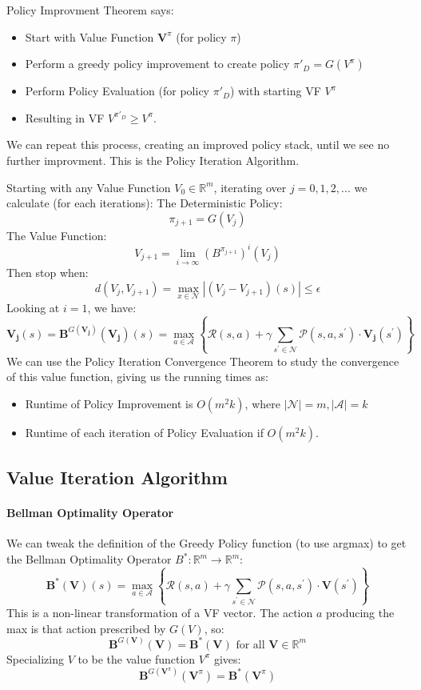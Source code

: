 \documentclass[11pt]{article}
\begin{document}
Policy Improvment Theorem says:
\begin{itemize}
    \item Start with Value Function $\boldsymbol{V}^\pi$ (for policy $\pi$)
    \item Perform a greedy policy improvement to create policy $\pi'_D=G(V^\pi)$
    \item Perform Policy Evaluation (for policy $\pi'_D$) with starting VF $V^\pi$
    \item Resulting in VF $V^{\pi'_D} \geq V^\pi$.
\end{itemize}
We can repeat this process, creating an improved policy stack, until we see no further improvment. This is the Policy Iteration Algorithm.

Starting with any Value Function $V_0\in\mathbb{R}^m$, iterating over $j = 0, 1, 2, ...$ we calculate (for each iterations):
The Deterministic Policy:
$$ \pi_{j+1} = G(V_j)$$
The Value Function:
$$ V_{j+1} = \lim_{i\rightarrow\infty}(B^{\pi_{j+1}})^i(V_j)$$
Then stop when:
$$ d(V_j, V_{j+1}) = \max_{x\in\mathcal{N}}|(V_j - V_{j+1})(s)| \leq \epsilon$$
Looking at $i = 1$, we have: 
$$
\boldsymbol{V}_{\boldsymbol{j}}(s)=\boldsymbol{B}^{G\left(\boldsymbol{V}_{\boldsymbol{j}}\right)}\left(\boldsymbol{V}_{\boldsymbol{j}}\right)(s)=\max _{a \in \mathcal{A}}\left\{\mathcal{R}(s, a)+\gamma \sum_{s^{\prime} \in \mathcal{N}} \mathcal{P}\left(s, a, s^{\prime}\right) \cdot \boldsymbol{V}_{\boldsymbol{j}}\left(s^{\prime}\right)\right\}
$$
We can use the Policy Iteration Convergence Theorem to study the convergence of this value function, giving us the running times as:
\begin{itemize}
    \item Runtime of Policy Improvement is $O(m^2k)$, where $|\mathcal{N}| = m, |\mathcal{A}| = k$
    \item Runtime of each iteration of Policy Evaluation if $O(m^2k)$. 
\end{itemize}
\subsection*{Value Iteration Algorithm}
\paragraph*{Bellman Optimality Operator}
We can tweak the definition of the Greedy Policy function (to use argmax) to get the Bellman Optimality Operator $B^*:\mathbb{R}^m\rightarrow\mathbb{R}^m$:
$$
\boldsymbol{B}^*(\boldsymbol{V})(s)=\max _{a \in \mathcal{A}}\left\{\mathcal{R}(s, a)+\gamma \sum_{s^{\prime} \in \mathcal{N}} \mathcal{P}\left(s, a, s^{\prime}\right) \cdot \boldsymbol{V}\left(s^{\prime}\right)\right\}
$$
This is a non-linear transformation of a VF vector. The action $a$ producing the max is that action prescribed by $G(V)$, so:
$$
\boldsymbol{B}^{G(\boldsymbol{V})}(\boldsymbol{V})=\boldsymbol{B}^*(\boldsymbol{V}) \text { for all } \boldsymbol{V} \in \mathbb{R}^m
$$
Specializing $V$ to be the value function $V^\pi$ gives:
$$
\boldsymbol{B}^{G\left(\boldsymbol{V}^\pi\right)}\left(\boldsymbol{V}^\pi\right)=\boldsymbol{B}^*\left(\boldsymbol{V}^\pi\right)
$$
\end{document}
